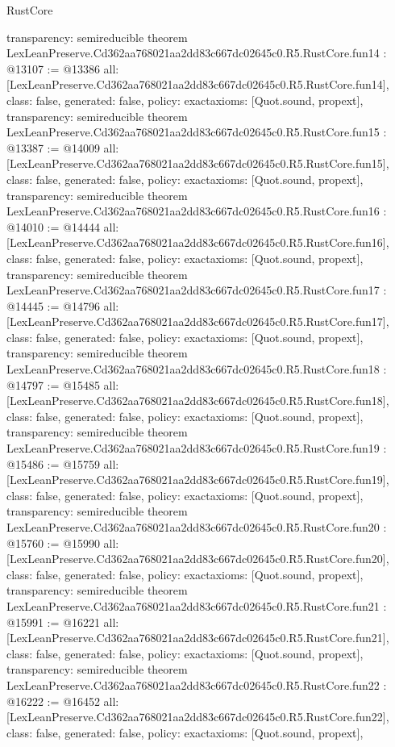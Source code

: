 \begin{lexlean}{RustCore}
\begin{coremodule}
{  transparency: semireducible
}
theorem LexLeanPreserve.Cd362aa768021aa2dd83c667dc02645c0.R5.RustCore.fun14 : @13107 := @13386 {
  all: [LexLeanPreserve.Cd362aa768021aa2dd83c667dc02645c0.R5.RustCore.fun14],
  class: false,
  generated: false,
  policy: exact{axioms: [Quot.sound, propext]},
  transparency: semireducible
}
theorem LexLeanPreserve.Cd362aa768021aa2dd83c667dc02645c0.R5.RustCore.fun15 : @13387 := @14009 {
  all: [LexLeanPreserve.Cd362aa768021aa2dd83c667dc02645c0.R5.RustCore.fun15],
  class: false,
  generated: false,
  policy: exact{axioms: [Quot.sound, propext]},
  transparency: semireducible
}
theorem LexLeanPreserve.Cd362aa768021aa2dd83c667dc02645c0.R5.RustCore.fun16 : @14010 := @14444 {
  all: [LexLeanPreserve.Cd362aa768021aa2dd83c667dc02645c0.R5.RustCore.fun16],
  class: false,
  generated: false,
  policy: exact{axioms: [Quot.sound, propext]},
  transparency: semireducible
}
theorem LexLeanPreserve.Cd362aa768021aa2dd83c667dc02645c0.R5.RustCore.fun17 : @14445 := @14796 {
  all: [LexLeanPreserve.Cd362aa768021aa2dd83c667dc02645c0.R5.RustCore.fun17],
  class: false,
  generated: false,
  policy: exact{axioms: [Quot.sound, propext]},
  transparency: semireducible
}
theorem LexLeanPreserve.Cd362aa768021aa2dd83c667dc02645c0.R5.RustCore.fun18 : @14797 := @15485 {
  all: [LexLeanPreserve.Cd362aa768021aa2dd83c667dc02645c0.R5.RustCore.fun18],
  class: false,
  generated: false,
  policy: exact{axioms: [Quot.sound, propext]},
  transparency: semireducible
}
theorem LexLeanPreserve.Cd362aa768021aa2dd83c667dc02645c0.R5.RustCore.fun19 : @15486 := @15759 {
  all: [LexLeanPreserve.Cd362aa768021aa2dd83c667dc02645c0.R5.RustCore.fun19],
  class: false,
  generated: false,
  policy: exact{axioms: [Quot.sound, propext]},
  transparency: semireducible
}
theorem LexLeanPreserve.Cd362aa768021aa2dd83c667dc02645c0.R5.RustCore.fun20 : @15760 := @15990 {
  all: [LexLeanPreserve.Cd362aa768021aa2dd83c667dc02645c0.R5.RustCore.fun20],
  class: false,
  generated: false,
  policy: exact{axioms: [Quot.sound, propext]},
  transparency: semireducible
}
theorem LexLeanPreserve.Cd362aa768021aa2dd83c667dc02645c0.R5.RustCore.fun21 : @15991 := @16221 {
  all: [LexLeanPreserve.Cd362aa768021aa2dd83c667dc02645c0.R5.RustCore.fun21],
  class: false,
  generated: false,
  policy: exact{axioms: [Quot.sound, propext]},
  transparency: semireducible
}
theorem LexLeanPreserve.Cd362aa768021aa2dd83c667dc02645c0.R5.RustCore.fun22 : @16222 := @16452 {
  all: [LexLeanPreserve.Cd362aa768021aa2dd83c667dc02645c0.R5.RustCore.fun22],
  class: false,
  generated: false,
  policy: exact{axioms: [Quot.sound, propext]},
}
\end{coremodule}
\end{lexlean}
